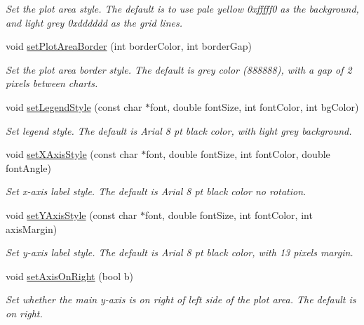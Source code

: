 \begin{DoxyCompactItemize}
\begin{DoxyCompactList}\small\item\em Set the plot area style. The default is to use pale yellow 0xfffff0 as the background, and light grey 0xdddddd as the grid lines. \end{DoxyCompactList}\item 
void \hyperlink{class_finance_chart_a8bd04e96ef80bda7605b7797ec93f9d7}{set\+Plot\+Area\+Border} (int border\+Color, int border\+Gap)
\begin{DoxyCompactList}\small\item\em Set the plot area border style. The default is grey color (888888), with a gap of 2 pixels between charts. \end{DoxyCompactList}\item 
void \hyperlink{class_finance_chart_ad84cdcdbddfa16a2441ff1e835d18a88}{set\+Legend\+Style} (const char $\ast$font, double font\+Size, int font\+Color, int bg\+Color)
\begin{DoxyCompactList}\small\item\em Set legend style. The default is Arial 8 pt black color, with light grey background. \end{DoxyCompactList}\item 
void \hyperlink{class_finance_chart_a7a122e42103adee8a4567ef67d498366}{set\+X\+Axis\+Style} (const char $\ast$font, double font\+Size, int font\+Color, double font\+Angle)
\begin{DoxyCompactList}\small\item\em Set x-\/axis label style. The default is Arial 8 pt black color no rotation. \end{DoxyCompactList}\item 
void \hyperlink{class_finance_chart_aceb042502a4a86f3eff7fb21dd443251}{set\+Y\+Axis\+Style} (const char $\ast$font, double font\+Size, int font\+Color, int axis\+Margin)
\begin{DoxyCompactList}\small\item\em Set y-\/axis label style. The default is Arial 8 pt black color, with 13 pixels margin. \end{DoxyCompactList}\item 
void \hyperlink{class_finance_chart_a603fc3911e3fc85c69ff9340f85c3d85}{set\+Axis\+On\+Right} (bool b)
\begin{DoxyCompactList}\small\item\em Set whether the main y-\/axis is on right of left side of the plot area. The default is on right. \end{DoxyCompactList}\item 

\end{DoxyCompactItemize}
